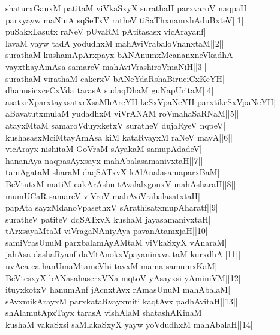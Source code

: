 \documentclass{article}
\begin{document}
shaturxGanxM patitaM viVkaSxyX surathaH parxvaroV naqpaH|\\
parxyayw maNinA sqSeTxV ratheV tiSaThxnamxhAduBxteV||1||\\
puSakxLasutx raNeV pUvaRM pAtitasasx vicArayanf|\\
lavaM yayw tadA yodudhxM mahAviVrabaloVnanxtaM||2||\\
surathaM kushamApArxpayx bANAnumxMcananxneVkadhA|\\
vayxthayAmAsa samareV mahAviVrashiroVmaNiH||3||\\
surathaM virathaM cakerxV bANeYdaRshaBiruciCxKeYH|\\
dhanusicxceCxVda tarasA sudaqDhaM guNapUritaM||4||\\
asatxrXparxtayxsatxrXsaMhAreYH keSxVpaNeYH parxtikeSxVpaNeYH|\\
aBavatutxmulaM yudadhxM viVrANAM roVmahaSaRNaM||5||\\
atayxMtaM samaroVduyxketxV suratheV dujaRyeV nqpeV|\\
kushasasxMciMtayAmAsa kiM kataRvayxM raNeV mayA||6||\\
vicArayx nishitaM GoVraM sAyakaM samupAdadeV|\\
hananAya naqpasAyxsayx mahAbalasamanivxtaH||7||\\
tamAgataM sharaM daqSATxvX kAlAnalasamaparxBaM|\\
BeVtutxM matiM cakArAshu tAvalalxgonxV mahAsharaH||8||\\
mumUCaR samareV viVroV mahAviVrabalasatxtaH|\\
papAta sayxMdanoVpasethxV sArathisatxmupAharatf||9||\\
suratheV patiteV dqSATxvX kushaM jayasamanivxtaH|\\
tArxsayaMtaM viVragaNAniyAya pavanAtamxjaH||10||\\
samiVrasUnuM parxbalamAyAMtaM viVkaSxyX vAnaraM|\\
ja{hA}sa dashaRyanf daMtAnokxVpayaninxva taM kurxdhA||11||\\
uvAca ca hanUmaMtameVhi tavxM mama samumxKaM|\\
BeVtesxyX bANasahaserxVNa mqtoV yAsayxsi yAminiVM||12||\\
ituyxkotxV hanumAnf jAcnxtAvx rAmasUnuM mahAbalaM|\\
sAvxmikArayxM parxkataRvayxmiti kaqtAvx padhAvitaH||13||\\
shAlamutApxTayx tarasA vishAlaM shatashAKinaM|\\
kushaM vakaSxsi saMlakaSxyX yayw yoVdudhxM mahAbalaH||14||\\
\end{document}
